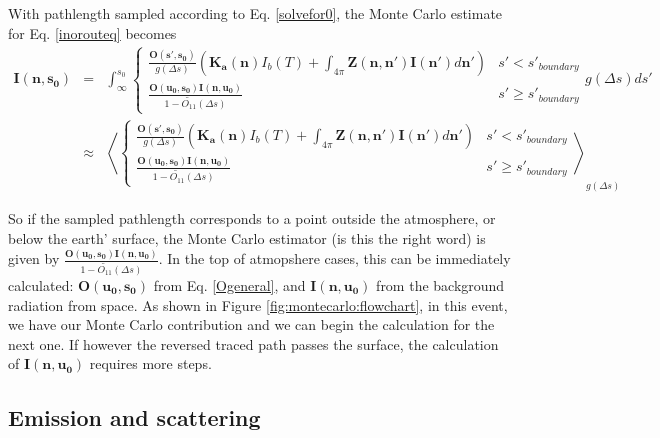 With pathlength sampled according to Eq. \ref{solvefor0}, the Monte
Carlo estimate for Eq. \ref{inorouteq} becomes
\begin{eqnarray}
\mathbf{I(n,s_0)}&=&\int^{s_0}_\infty\left\{\begin{array}{rl}
\frac{\mathbf{O(s',s_0)}}{g(\Delta s)}\left(\mathbf{K_a(n)}I_b(T)
+\int_{4\pi}\mathbf{Z(n,n')}\mathbf{I(n')}d\mathbf{n'}\right) & s'< s'_{boundary} \\
\frac{\mathbf{O(u_0,s_0)I(n,u_0)}}{1-\tilde{O_{11}}(\Delta s)} & s'\ge s'_{boundary}
\end{array}g(\Delta s)ds'\right.\nonumber\\
&\approx&\left\langle\left\{\begin{array}{rl}
\frac{\mathbf{O(s',s_0)}}{g(\Delta s)}\left(\mathbf{K_a(n)}I_b(T)
+\int_{4\pi}\mathbf{Z(n,n')}\mathbf{I(n')}d\mathbf{n'}\right) & s'< s'_{boundary} \\
\frac{\mathbf{O(u_0,s_0)I(n,u_0)}}{1-\tilde{O_{11}}(\Delta s)} & s'\ge s'_{boundary}
\end{array}\right.\right\rangle_{g(\Delta s)}
\label{pathlengthint}
\end{eqnarray} 

So if the sampled pathlength corresponds to a point outside the
atmosphere, or below the earth' surface, the Monte Carlo estimator (is this
the right word) is given by
$\frac{\mathbf{O(u_0,s_0)I(n,u_0)}}{1-\tilde{O_{11}}(\Delta s)}$. In the
top of atmopshere cases, this can be immediately calculated:
$\mathbf{O(u_0,s_0)}$ from Eq. \ref{Ogeneral}, and $\mathbf{I(n,u_0)}$ from
  the background radiation from space.  As shown in Figure
  \ref{fig:montecarlo:flowchart}, in this event, we have our Monte
  Carlo contribution and we can begin the calculation for the next
  one.  If however the reversed traced path passes the surface, the
  calculation of $\mathbf{I(n,u_0)}$ requires more steps.

\subsection{Emission and scattering}

